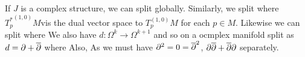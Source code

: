 \documentclass{article}
\begin{document}
If $J$ is a complex structure, we can split 
globally. Similarly, we split 
where ${T_p^\ast}^{(1,0)}M $vis the dual vector space to $T_p^{(1,0)}M$ for each $p\in M$. Likewise we can split 
where
We also have $d : \Omega^k \to \Omega^{k+1}$ and so on a ocmplex manifold split as $d = \partial + \overline{\partial}$ where 
Also, 
As we must have  $\partial^2 = 0 = \overline{\partial}^2$, $\partial\overline{\partial} + \overline{\partial} \partial$ separately.  
\end{document}
